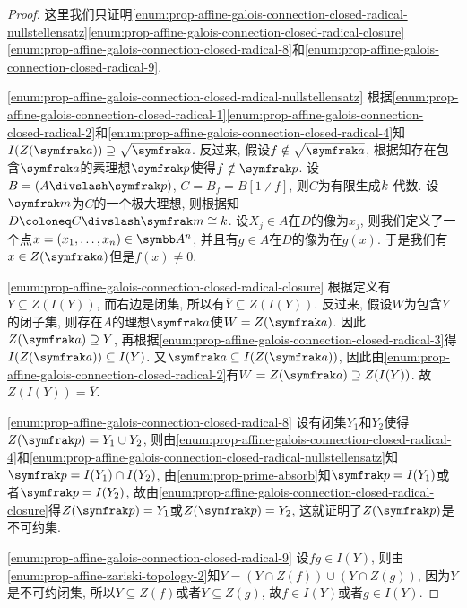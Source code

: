 \begin{proof}
    这里我们只证明\ref{enum:prop-affine-galois-connection-closed-radical-nullstellensatz}\ref{enum:prop-affine-galois-connection-closed-radical-closure}\ref{enum:prop-affine-galois-connection-closed-radical-8}和\ref{enum:prop-affine-galois-connection-closed-radical-9}.

    \ref{enum:prop-affine-galois-connection-closed-radical-nullstellensatz} 根据\ref{enum:prop-affine-galois-connection-closed-radical-1}\ref{enum:prop-affine-galois-connection-closed-radical-2}和\ref{enum:prop-affine-galois-connection-closed-radical-4}知$I(Z(\ideal{a}))\supseteq\sqrt{\ideal{a}}$. 反过来, 假设$f\notin\sqrt{\ideal{a}}$, 根据知存在包含$\ideal{a}$的素理想$\ideal{p}$使得$f\notin\ideal{p}$. 设$B=(A{\divslash}\ideal{p})$, $C=B_{f}=B[1{\divslash}f]$, 则$C$为有限生成$k$-代数. 设$\ideal{m}$为$C$的一个极大理想, 则根据知$D\coloneq C{\divslash}\ideal{m}\cong\kk$. 设$X_j\in A$在$D$的像为$x_j$, 则我们定义了一个点$x=(x_1, \dotsc, x_n)\in \AF^n$, 并且有$g\in A$在$D$的像为在$g(x)$. 于是我们有$x\in Z(\ideal{a})$但是$f(x)\neq 0$.

    \ref{enum:prop-affine-galois-connection-closed-radical-closure} 根据定义有$Y\subseteq Z(I(Y))$, 而右边是闭集, 所以有$\overline{Y}\subseteq Z(I(Y))$. 反过来, 假设$W$为包含$Y$的闭子集, 则存在$A$的理想$\ideal{a}$使$W=Z(\ideal{a})$. 因此$Z(\ideal{a})\supseteq Y$, 再根据\ref{enum:prop-affine-galois-connection-closed-radical-3}得$I(Z(\ideal{a}))\subseteq I(Y)$. 又$\ideal{a}\subseteq I(Z(\ideal{a}))$, 因此由\ref{enum:prop-affine-galois-connection-closed-radical-2}有$W=Z(\ideal{a})\supseteq Z(I(Y))$. 故$Z(I(Y))=\overline{Y}$.

    \ref{enum:prop-affine-galois-connection-closed-radical-8} 设有闭集$Y_1$和$Y_2$使得$Z(\ideal{p})=Y_1\cup Y_2$, 则由\ref{enum:prop-affine-galois-connection-closed-radical-4}和\ref{enum:prop-affine-galois-connection-closed-radical-nullstellensatz}知$\ideal{p}=I(Y_1)\cap I(Y_2)$, 由\ref{enum:prop-prime-absorb}知$\ideal{p}=I(Y_1)$或者$\ideal{p}=I(Y_2)$, 故由\ref{enum:prop-affine-galois-connection-closed-radical-closure}得$Z(\ideal{p})=Y_1$或$Z(\ideal{p})=Y_2$, 这就证明了$Z(\ideal{p})$是不可约集.

    \ref{enum:prop-affine-galois-connection-closed-radical-9} 设$fg\in I(Y)$, 则由\ref{enum:prop-affine-zariski-topology-2}知$Y=(Y\cap Z(f))\cup (Y\cap Z(g))$, 因为$Y$是不可约闭集, 所以$Y\subseteq Z(f)$或者$Y\subseteq Z(g)$, 故$f\in I(Y)$或者$g\in I(Y)$.
\end{proof}

